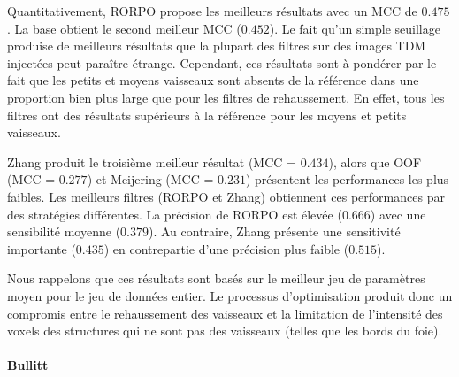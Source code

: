 Quantitativement, RORPO propose les meilleurs résultats avec un MCC de $0.475$. La base obtient le second meilleur MCC ($0.452$). Le fait qu'un simple seuillage produise de meilleurs résultats que la plupart des filtres sur des images TDM injectées peut paraître étrange. Cependant, ces résultats sont à pondérer par le fait que les petits et moyens vaisseaux sont absents de la référence dans une proportion bien plus large que pour les filtres de rehaussement. En effet, tous les filtres ont des résultats supérieurs à la référence pour les moyens et petits vaisseaux.  

Zhang produit le troisième meilleur résultat (MCC = $0.434$), alors que OOF (MCC = $0.277$) et Meijering (MCC = $0.231$) présentent les performances les plus faibles. Les meilleurs filtres (RORPO et Zhang) obtiennent ces performances par des stratégies différentes. La précision de RORPO est élevée ($0.666$) avec une sensibilité moyenne ($0.379$). Au contraire, Zhang présente une sensitivité importante ($0.435$) en contrepartie d'une précision plus faible ($0.515$).

Nous rappelons que ces résultats sont basés sur le meilleur jeu de paramètres moyen pour le jeu de données entier. Le processus d'optimisation produit donc un compromis entre le rehaussement des vaisseaux et la limitation de l'intensité des voxels des structures qui ne sont pas des vaisseaux (telles que les bords du foie). 


\paragraph{Bullitt}


